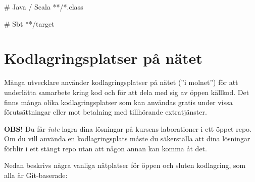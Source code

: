 \begin{itemize}[leftmargin=*]
\begin{Code}[language=]
# Java / Scala
**/*.class

# Sbt
**/target

\end{Code} 


\end{itemize}
 

\clearpage 
  
\section{Kodlagringsplatser på nätet}\label{section:code-hosting}

Många utvecklare använder kodlagringsplatser på nätet (''i molnet'')  för att underlätta samarbete kring kod och för att dela med sig av öppen källkod. Det finns många olika kodlagringsplatser som kan användas gratis under vissa förutsättningar eller mot betalning med tillhörande extratjänster. 

\begin{oframed}
  \noindent \textbf{OBS!} Du får \emph{inte} lagra dina lösningar på kursens laborationer i ett öppet repo. Om du vill använda en kodlagringsplats måste du säkerställa att dina lösningar förblir i ett stängt repo utan att någon annan kan komma åt det.
\end{oframed}

Nedan beskrivs några vanliga nätplatser för öppen och sluten kodlagring, som alla är Git-baserade:

